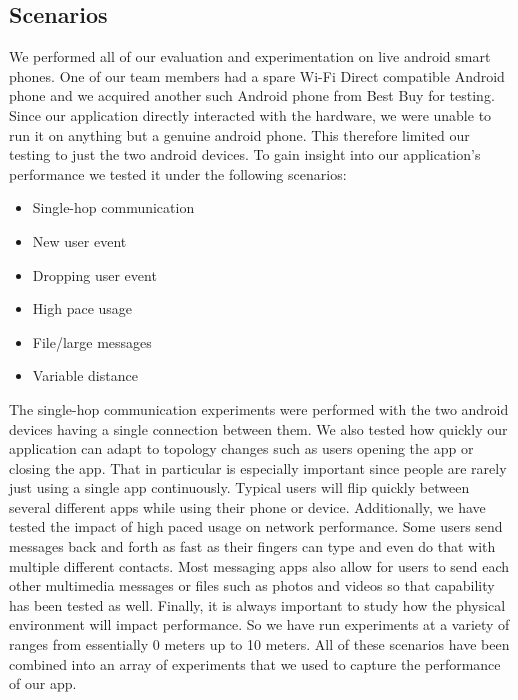 \documentclass[10pt]{article}
\begin{document}
\subsection{Scenarios}

We performed all of our evaluation and experimentation on live android smart phones. One of our team members had a spare Wi-Fi Direct compatible Android phone and we acquired another such Android phone from Best Buy for testing. Since our application directly interacted with the hardware, we were unable to run it on anything but a genuine android phone. This therefore limited our testing to just the two android devices. To gain insight into our application's performance we tested it under the following scenarios:

\begin{itemize}
    \item Single-hop communication
    \item New user event
    \item Dropping user event
    \item High pace usage
    \item File/large messages
    \item Variable distance
\end{itemize}

The single-hop communication experiments were performed with the two android devices having a single connection between them. We also tested how quickly our application can adapt to topology changes such as users opening the app or closing the app. That in particular is especially important since people are rarely just using a single app continuously. Typical users will flip quickly between several different apps while using their phone or device. Additionally, we have tested the impact of high paced usage on network performance. Some users send messages back and forth as fast as their fingers can type and even do that with multiple different contacts. Most messaging apps also allow for users to send each other multimedia messages or files such as photos and videos so that capability has been tested as well. Finally, it is always important to study how the physical environment will impact performance. So we have run experiments at a variety of ranges from essentially 0 meters up to 10 meters. All of these scenarios have been combined into an array of experiments that we used to capture the performance of our app.

\end{document}
